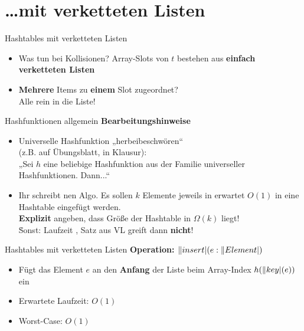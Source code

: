\section{\dots mit verketteten Listen}

\begin{frame}{Hashtables mit verketteten Listen}
	\begin{itemize}
		\item Was tun bei Kollisionen?
		\pause
		\implitem Array-Slots von $t$ bestehen aus \textbf{einfach verketteten Listen} \pause
		\item \textbf{Mehrere} Items zu \textbf{einem} Slot zugeordnet? \\
		Alle rein in die Liste!
	\end{itemize}
\end{frame}

\begin{frame}{Hashfunktionen allgemein}
	\textbf{Bearbeitungshinweise}
	\begin{itemize}
		\item Universelle Hashfunktion „herbeibeschwören“ \\
		{\small (z.B. auf Übungsblatt, in Klausur)}: \\
		„Sei $h$ eine beliebige Hashfunktion aus der Familie universeller Hashfunktionen. Dann...“ 
		\item Ihr schreibt nen Algo. Es sollen $k$ Elemente jeweils in erwartet $O(1)$ in eine Hashtable eingefügt werden. \\
		\§{\impl} \textbf{Explizit} angeben, dass Größe der Hashtable in $\Omega(k)$ liegt! \\
		\. Sonst: Laufzeit , Satz aus VL greift dann \textbf{nicht}!
	\end{itemize}
\end{frame}


\begin{frame}{Hashtables mit verketteten Listen}
	\textbf{Operation: $\|insert|(e : \|Element|)$} \\[0,125cm]
	\begin{itemize}
		\item Fügt das Element $e$ an den \textbf{Anfang} der Liste beim Array-Index $h(\|key|(e))$ ein
		\pause
		\item Erwartete Laufzeit: $O(1)$
		\item Worst-Case: $O(1)$
	\end{itemize}
\end{frame}

